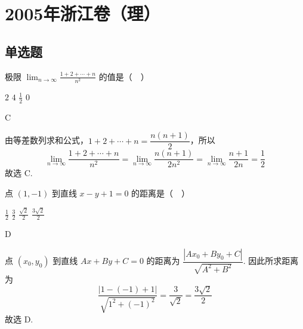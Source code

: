 \chapter{2005年浙江卷（理）}

\section{单选题}
\begin{problem}
极限 \(\displaystyle\lim_{n \to \infty} \frac{1+2+\cdots+n}{n^{2}}\) 的值是（\(\quad\)）

\choices
    {\(2\)}
    {\(4\)}
    {\(\frac{1}{2}\)}
    {\(0\)}

\begin{answer}
C
\end{answer}

\begin{solution}
由等差数列求和公式，\(1+2+\cdots+n=\dfrac{n(n+1)}{2}\)，所以
\[
\displaystyle\lim_{n\to\infty}\frac{1+2+\cdots+n}{n^{2}}
=\displaystyle\lim_{n\to\infty}\frac{n(n+1)}{2n^{2}}
=\displaystyle\lim_{n\to\infty}\frac{n+1}{2n}=\frac{1}{2}
\]
故选 C.
\end{solution}
\end{problem}

\begin{problem}
点 \((1,-1)\) 到直线 \(x-y+1=0\) 的距离是（\(\quad\)）

\choices
    {\(\frac{1}{2}\)}
    {\(\frac{3}{2}\)}
    {\(\frac{\sqrt{2}}{2}\)}
    {\(\frac{3\sqrt{2}}{2}\)}

\begin{answer}
D
\end{answer}

\begin{solution}
点 \((x_0,y_0)\) 到直线 \(Ax+By+C=0\) 的距离为
\(\dfrac{|Ax_0+By_0+C|}{\sqrt{A^2+B^2}}\). 因此所求距离为
\[
\frac{|1-(-1)+1|}{\sqrt{1^2+(-1)^2}}
=\frac{3}{\sqrt{2}}=\frac{3\sqrt{2}}{2}
\]
故选 D.
\end{solution}
\end{problem}

